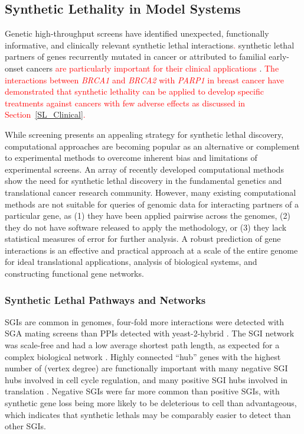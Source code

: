 \subsection{Synthetic Lethality in Model Systems}
Genetic \glspl{high-throughput screen} have identified unexpected, functionally informative, and clinically relevant \gls{synthetic lethal} interactions\textcolor{red}{.} \Gls{synthetic lethal} partners of genes recurrently mutated in cancer or attributed to \gls{familial} early-onset cancers \textcolor{red}{are particularly important for their clinical applications} \citep{Lord2014}. \textcolor{red}{The interactions between \textit{BRCA1} and \textit{BRCA2} with \textit{PARP1} in breast cancer \citep{Bryant2005, Farmer2005} have demonstrated that synthetic lethality can be applied to develop specific treatments against cancers with few adverse effects \cite{McLachlan2016} as discussed in Section~\ref{SL_Clinical}.}

While screening presents an appealing strategy for \gls{synthetic lethal} discovery, computational approaches are becoming popular as an alternative or complement to experimental methods to overcome inherent bias and limitations of experimental screens. An array of recently developed computational methods \citep{Wang2013, Tiong2014, Jerby2014, Lu2015, Wappett2014} show the need for \gls{synthetic lethal} discovery in the fundamental genetics and translational cancer research community. However, many existing computational methods are not suitable for queries of \gls{genomic} data for interacting partners of a particular gene, as (1) they have been applied pairwise across the \glspl{genome}, (2) they do not have software released to apply the methodology, or (3) they lack statistical measures of error for further analysis. A robust prediction of gene interactions is an effective and practical approach at a scale of the entire \gls{genome} for ideal translational applications, analysis of biological systems, and constructing functional gene networks.

\subsubsection{Synthetic Lethal Pathways and Networks}
\glspl{SGI} are common in \glspl{genome}, four-fold more interactions were detected with \gls{SGA} mating screens than \glspl{PPI} detected with yeast-2-hybrid \citep{Tong2004}. The \gls{SGI} network was \gls{scale-free} and had a low average \gls{shortest path} length, as expected for a complex biological network \citep{Barabasi2004}. Highly connected ``hub'' genes with the highest number of  (\gls{vertex degree}) are functionally important with many negative \gls{SGI} hubs involved in cell cycle regulation, and many positive \gls{SGI} hubs involved in translation \citep{Baryshnikova2010b, Costanzo2010}. Negative \glspl{SGI} were far more common than positive \glspl{SGI}, with synthetic gene loss being more likely to be deleterious to cell than advantageous, which indicates that \glspl{synthetic lethal} may be comparably easier to detect than other \glspl{SGI}. 

